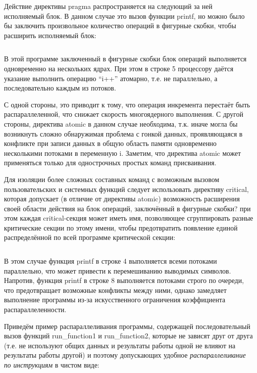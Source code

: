 Действие директивы pragma распространяется на следующий за ней исполняемый блок. В данном случае это вызов функции printf, но можно было бы заключить произвольное количество операций в фигурные скобки, чтобы расширить исполняемый блок:
\inputminted{c++}{listings/OpenMPExample2.cpp}

В этой программе заключенный в фигурные скобки блок операций выполняется одновременно на нескольких ядрах. При этом в строке 5 процессору даётся указание выполнить операцию ``i++'' атомарно, т.е. не параллельно, а последовательно каждым из потоков. 

С одной стороны, это приводит к тому, что операция инкремента перестаёт быть распараллеленной, что снижает скорость многоядерного выполнения. С другой стороны, директива atomic в данном случае необходима, т.к. иначе могла бы возникнуть сложно обнаружимая проблема с гонкой данных, проявляющаяся в конфликте при записи данных в общую область памяти одновременно несколькими потоками в переменную i. Заметим, что директива atomic может применяться только для однострочных простых команд присваивания. 

Для изоляции более сложных составных команд с возможным вызовом пользовательских и системных функций следует использовать директиву critical, которая допускает (в отличие от директивы atomic) возможность расширения своей области действия на блок операций, заключённый в фигурные скобки? при этом каждая critical-секция может иметь имя, позволяющее сгруппировать разные критические секции по этому имени, чтобы предотвратить появление единой распределённой по всей программе критической секции:
\inputminted{c++}{listings/OpenMPExample3.cpp}

В этом случае функция printf в строке 4 выполняется всеми потоками параллельно, что может привести к перемешиванию выводимых символов. Напротив, функция printf в строке 8 выполняется потоками строго по очереди, что предотвращает возможные конфликты между ними, однако замедляет выполнение программы из-за искусственного ограничения коэффициента распараллеленности.

Приведём пример распараллеливания программы, содержащей последовательный вызов функций run\_function1 и run\_function2, которые не зависят друг от друга (т.е. не используют общих данных и результаты работы одной не влияют на результаты работы другой) и поэтому допускающих удобное \textit{распараллеливание по инструкциям} в чистом виде:

\inputminted{c++}{listings/OpenMPExample4.cpp}

